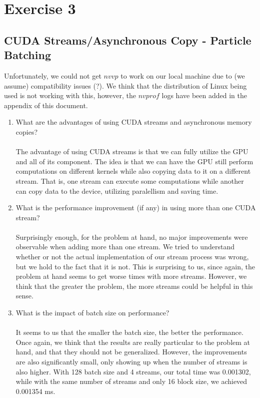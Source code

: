 \documentclass[english]{exam}
\begin{document}
\clearpage
\chapter{Exercise 3}
\section*{CUDA Streams/Asynchronous Copy - Particle Batching}

Unfortunately, we could not get $nvvp$ to work on our local machine due to (we assume) compatibility issues (?). We think that the distribution of Linux being used is not working with this, however, the $nvprof$ logs have been added in the appendix of this document.

\begin{enumerate}
\item What are the advantages of using CUDA streams and asynchronous memory copies? \\\\
  The advantage of using CUDA streams is that we can fully utilize the GPU and all of its component. The idea is that we can have the GPU still perform computations on different kernels while also copying data to it on a different stream. That is, one stream can execute some computations while another can copy data to the device, utilizing paralellism and saving time.
  
\item What is the performance improvement (if any) in using more than one CUDA stream? \\\\
  Surprisingly enough, for the problem at hand, no major improvements were observable when adding more than one stream. We tried to understand whether or not the actual implementation of our stream process was wrong, but we hold to the fact that it is not. This is surprising to us, since again, the problem at hand seems to get worse times with more streams. However, we think that the greater the problem, the more streams could be helpful in this sense.
  
\item What is the impact of batch size on performance? \\\\
  It seems to us that the smaller the batch size, the better the performance. Once again, we think that the results are really particular to the problem at hand, and that they should not be generalized. However, the improvements are also significantly small, only showing up when the number of streams is also higher. With 128 batch size and 4 streams, our total time was 0.001302, while with the same number of streams and only 16 block size, we achieved 0.001354 ms.
\end{enumerate}
\end{document}
